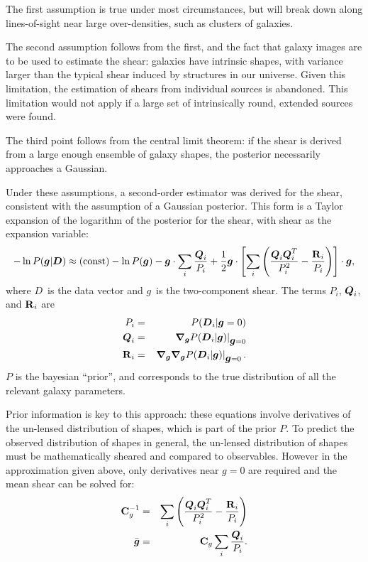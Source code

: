 \documentclass[12pt,preprint]{aastex}
\newcommand{\vecg}{\mbox{\boldmath $g$}}
\newcommand{\vecD}{\mbox{\boldmath $D$}}
\newcommand{\vecQ}{\mbox{\boldmath $Q$}}
\newcommand{\matR}{\mbox{$\bf R$}}
\newcommand{\matC}{\mbox{$\bf C$}}
\newcommand{\bnabg}{ \boldsymbol{\nabla_g}}
\begin{document}
The first assumption is true under most circumstances, but will break down
along lines-of-sight near large over-densities, such as clusters of galaxies.

The second assumption follows from the first, and the fact that galaxy images
are to be used to estimate the shear: galaxies have intrinsic shapes, with
variance larger than the typical shear induced by structures in our universe.
Given this limitation, the estimation of shears from individual sources is
abandoned.  This limitation would not apply if a large set of intrinsically
round, extended sources were found.

The third point follows from the central limit theorem: if the shear is derived
from a large enough ensemble of galaxy shapes, the posterior necessarily
approaches a Gaussian.

Under these assumptions, a second-order estimator was derived for the shear,
consistent with the assumption of a Gaussian posterior.  This form is a Taylor
expansion of the logarithm of the posterior for the shear, with shear as the
expansion variable:
\begin{equation} \label{eq:pexpand}
-\ln P(\vecg | \vecD) \approx {(\rm const)} - \ln P(\vecg) - \vecg \cdot \sum_i
    \frac{\vecQ_i}{P_i}
    + \frac{1}{2} \vecg \cdot \left[ \sum_i \left(\frac{\vecQ_i \vecQ^T_i}{P_i^2}
    - \frac{\matR_i}{P_i}\right) \right] \cdot \vecg,
\end{equation}
where \vecD\ is the data vector and \vecg\ is the two-component shear.  The
terms $P_i$, $\vecQ_i$, and $\matR_i$ are 
\begin{eqnarray} \label{eq:pqrdef}
P_i     & = & P(\vecD_i | \vecg=0) \nonumber \\
\vecQ_i & = & \left. \bnabg P(\vecD_i | \vecg)\right|_{\vecg=0} \\
\matR_i & = & \left. \bnabg \bnabg P(\vecD_i | \vecg)\right|_{\vecg=0}. \nonumber
\end{eqnarray}
$P$ is the bayesian ``prior'', and corresponds to the true distribution
of all the relevant galaxy parameters.

Prior information is key to this approach: these equations involve derivatives
of the un-lensed distribution of shapes, which is part of the prior $P$. To
predict the observed distribution of shapes in general, the un-lensed
distribution of shapes must be mathematically sheared and compared to
observables.  However in the approximation given above, only derivatives near
$g=0$ are required and the mean shear can be solved for:
\begin{eqnarray} \label{eq:shdef}
\matC_g^{-1} & = & \sum_i \left(\frac{\vecQ_i \vecQ^T_i}{P_i^2} - \frac{\matR_i}{P_i}\right) \\
\bar{\vecg} & = &  \matC_g \sum_i \frac{\vecQ_i}{P_i}.
\end{eqnarray}
\end{document}
